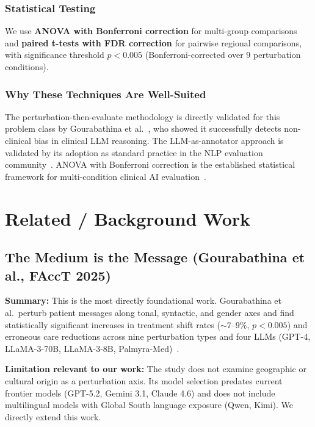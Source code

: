 \documentclass[12pt, a4paper]{article}
\begin{document}
\subsubsection{Statistical Testing}
We use \textbf{ANOVA with Bonferroni correction} for multi-group comparisons and \textbf{paired t-tests with FDR correction} for pairwise regional comparisons, with significance threshold $p < 0.005$ (Bonferroni-corrected over 9 perturbation conditions).

\subsubsection{Why These Techniques Are Well-Suited}
The perturbation-then-evaluate methodology is directly validated for this problem class by Gourabathina et al.~\cite{gourabathina2025}, who showed it successfully detects non-clinical bias in clinical LLM reasoning. The LLM-as-annotator approach is validated by its adoption as standard practice in the NLP evaluation community~\cite{zheng2023}. ANOVA with Bonferroni correction is the established statistical framework for multi-condition clinical AI evaluation~\cite{armstrong2014}.

\section{Related / Background Work}

\subsection{The Medium is the Message (Gourabathina et al., FAccT 2025)}

\textbf{Summary:} This is the most directly foundational work. Gourabathina et al.\ perturb patient messages along tonal, syntactic, and gender axes and find statistically significant increases in treatment shift rates ($\sim$7--9\%, $p < 0.005$) and erroneous care reductions across nine perturbation types and four LLMs (GPT-4, LLaMA-3-70B, LLaMA-3-8B, Palmyra-Med)~\cite{gourabathina2025}.

\textbf{Limitation relevant to our work:} The study does not examine geographic or cultural origin as a perturbation axis. Its model selection predates current frontier models (GPT-5.2, Gemini 3.1, Claude 4.6) and does not include multilingual models with Global South language exposure (Qwen, Kimi). We directly extend this work.
\end{document}
